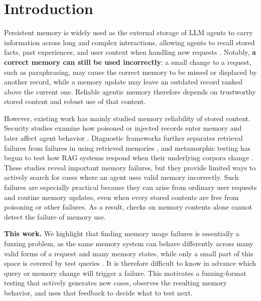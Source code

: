 \section{Introduction}
\label{sec:intro}

Persistent memory is widely used as the external storage of LLM agents to carry information across long and complex interactions, allowing agents to recall stored facts, past experiences, and user context when handling new requests \citep{maharana2024evaluating,wu2024longmemeval,hu2026evaluating}. Notably, \textbf{a correct memory can still be used incorrectly}: a small change to a request, such as paraphrasing, may cause the correct memory to be missed or displaced by another record, while a memory update may leave an outdated record ranked above the current one. Reliable agentic memory therefore depends on trustworthy stored content and robust use of that content.

However, existing work has mainly studied memory reliability of stored content. Security studies examine how poisoned or injected records enter memory and later affect agent behavior \citep{chen2024agentpoison,dong2025practical}. Diagnostic frameworks further separates retrieval failures from failures in using retrieved memories \citep{yuan2026diagnosing}, and metamorphic testing has begun to test how RAG systems respond when their underlying corpora change \citep{kim2026knowledge}. These studies reveal important memory failures, but they provide limited ways to actively search for cases where an agent uses valid memory incorrectly. Such failures are especially practical because they can arise from ordinary user requests and routine memory updates, even when every stored contents are free from poisoning or other failures. As a result, checks on memory contents alone cannot detect the failure of memory use.

\textbf{This work.}
We highlight that finding memory usage failures is essentially a fuzzing problem, as the same memory system can behave differently across many valid forms of a request and many memory states, while only a small part of this space is covered by test queries \cite{}. It is therefore difficult to know in advance which query or memory change will trigger a failure. This motivates a fuzzing-format testing that actively generates new cases, observes the resulting memory behavior, and uses that feedback to decide what to test next.


